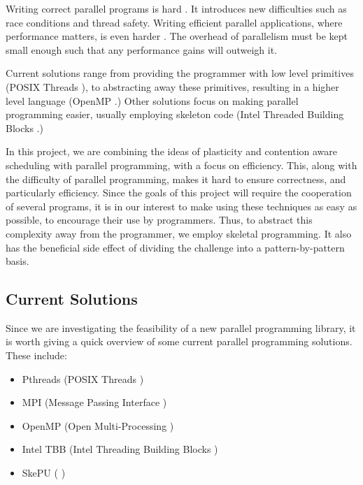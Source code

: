 Writing correct parallel programs is hard \cite{parallel_hard}. It introduces new difficulties such as race conditions and thread safety. Writing efficient parallel applications, where performance matters, is even harder \cite{parallel_hard_perf}. The overhead of parallelism must be kept small enough such that any performance gains will outweigh it. 

Current solutions range from providing the programmer with low level primitives (POSIX Threads \cite{posix_threads}), to abstracting away these primitives, resulting in a higher level language (OpenMP \cite{openmp}.) Other solutions focus on making parallel programming easier, usually employing skeleton code (Intel Threaded Building Blocks \cite{threading_building_blocks_2018}.)

In this project, we are combining the ideas of plasticity and contention aware scheduling with parallel programming, with a focus on efficiency. This, along with the difficulty of parallel programming, makes it hard to ensure correctness, and particularly efficiency. Since the goals of this project will require the cooperation of several programs, it is in our interest to make using these techniques as easy as possible, to encourage their use by programmers. Thus, to abstract this complexity away from the programmer, we employ skeletal programming. It also has the beneficial side effect of dividing the challenge into a pattern-by-pattern basis. 



\subsection{Current Solutions}
\label{section:background:current_solutions}

Since we are investigating the feasibility of a new parallel programming library, it is worth giving a quick overview of some current parallel programming solutions. These include:

\begin{itemize}
	\item Pthreads (POSIX Threads \cite{posix_threads})
	\item MPI 	   (Message Passing Interface \cite{mpi})
	\item OpenMP   (Open Multi-Processing \cite{openmp_home} \cite{openmp})
	\item Intel TBB (Intel Threading Building Blocks \cite{threading_building_blocks_2018} \cite{contreras_martonosi_2008})
	\item SkePU (\cite{skepu} \cite{skepu_2_2018})
\end{itemize}

